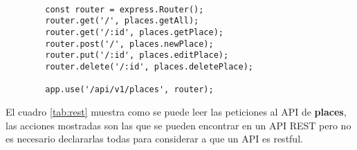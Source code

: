 \begin{center}
  \begin{lstlisting}[label=express_api,caption=Declarando API REST con ExpressJS]

        const router = express.Router();
        router.get('/', places.getAll);
        router.get('/:id', places.getPlace);
        router.post('/', places.newPlace);
        router.put('/:id', places.editPlace);
        router.delete('/:id', places.deletePlace);

        app.use('/api/v1/places', router);

  \end{lstlisting}
\end{center}




  El cuadro \ref{tab:rest} muestra como se puede leer las peticiones al API de \textbf{places}, las acciones mostradas son las que se pueden encontrar en un API REST pero no es necesario declararlas todas para considerar a que un API es restful.\\


